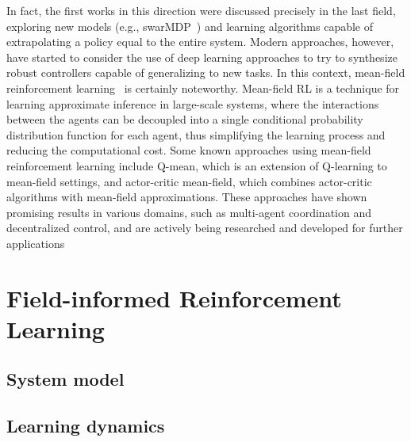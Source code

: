\documentclass[conference]{IEEEtran}
\begin{document}
In fact, the first works in this direction were discussed precisely in the last field, 
 exploring new models (e.g., swarMDP~\cite{DBLP:conf/atal/SosicKZK17}) and learning algorithms capable of extrapolating 
 a policy equal to the entire system. 
Modern approaches, however, 
 have started to consider the use of deep learning approaches to try 
 to synthesize robust controllers capable of generalizing to new tasks. 
In this context, mean-field reinforcement learning~\cite{pmlr-v80-yang18d} is certainly noteworthy. 
 Mean-field RL is a technique for learning approximate inference in large-scale systems, 
 where the interactions between the agents can be decoupled into a single conditional probability distribution function for each agent, 
 thus simplifying the learning process and reducing the computational cost.
%
Some known approaches using mean-field reinforcement learning include Q-mean, 
 which is an extension of Q-learning to mean-field settings, 
 and actor-critic mean-field, which combines actor-critic algorithms with mean-field approximations. 
%
These approaches have shown promising results in various domains, such as multi-agent coordination 
 and decentralized control, and are actively being researched and developed for further applications

\section{Field-informed Reinforcement Learning}
\label{sec:approach}
\subsection{System model}
\subsection{Learning dynamics}
\end{document}

